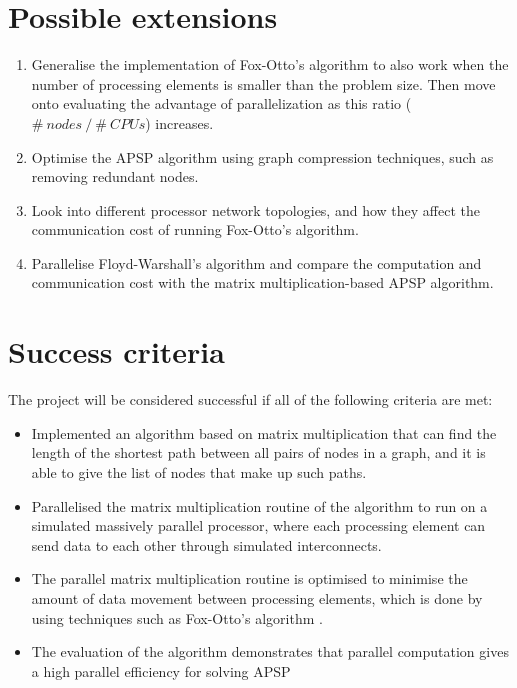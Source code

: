 \documentclass{article}
\begin{document}
\section*{Possible extensions}%
\label{sec:Possible extensions}

\begin{enumerate}
    \item Generalise the implementation of Fox-Otto's algorithm to also work when
        the number of processing elements is smaller than the problem size.
        Then move onto evaluating the advantage of parallelization as this ratio
        ( $\#~nodes~/~\#~CPUs$) increases.
    \item Optimise the APSP algorithm using graph compression techniques, such as
        removing redundant nodes.
    \item Look into different processor network topologies, and how they affect
        the communication cost of running Fox-Otto's algorithm.
    \item Parallelise Floyd-Warshall's algorithm and compare the
        computation and communication cost with the matrix multiplication-based
        APSP algorithm.
\end{enumerate}

\section*{Success criteria}%
\label{sec:Success criteria}

The project will be considered successful if all of the following criteria are met:
\begin{itemize}
    \item Implemented an algorithm based on matrix multiplication that can find the
        length of the shortest path between all pairs of nodes in a graph, and it is able
        to give the list of nodes that make up such paths.
    \item Parallelised the matrix multiplication routine of the algorithm to run on a simulated
        massively parallel processor, where each processing element can send data to each
        other through simulated interconnects.
    \item The parallel matrix multiplication routine is optimised to minimise the
        amount of data movement between processing elements, which is done
        by using techniques such as Fox-Otto's algorithm \cite{fox}.
    \item The evaluation of the algorithm demonstrates that parallel computation gives
        a high parallel efficiency for solving APSP
\end{itemize}
\end{document}
